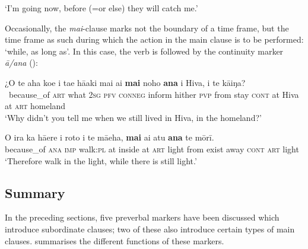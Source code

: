 \glt 
‘I’m going now, before (=or else) they will catch me.’ \textstyleExampleref{[R304.117]} 
\z

Occasionally, the \textit{mai}{}-clause marks not the boundary of a time frame, but the time frame as such during which the action in the main clause is to be performed: ‘while, as long as’. In this case, the verb is followed by the continuity marker \textit{{\ꞌ}ā/{\ꞌ}ana} ():

\ea\label{ex:11.208}
\gll ¿{\ꞌ}O te aha koe i ta{\ꞌ}e hā{\ꞌ}aki mai ai \textbf{mai} noho \textbf{{\ꞌ}ana}  {\ꞌ}i Hiva, {\ꞌ}i te kāiŋa?\\
~because\_of \textsc{art} what \textsc{2sg} \textsc{pfv} \textsc{conneg} inform hither \textsc{pvp} from stay \textsc{cont}  at Hiva at \textsc{art} homeland\\

\glt 
‘Why didn’t you tell me when we still lived in Hiva, in the homeland?’ \textstyleExampleref{[Ley-2-07.028]}
\z

\ea\label{ex:11.209}
\gll {\ꞌ}O ira ka hā{\ꞌ}ere {\ꞌ}i roto i te mā{\ꞌ}eha, \textbf{mai} ai atu \textbf{{\ꞌ}ana} te mōrī. \\
because\_of \textsc{ana} \textsc{imp} walk:\textsc{pl} at inside at \textsc{art} light from exist away \textsc{cont} \textsc{art} light \\

\glt 
‘Therefore walk in the light, while there is still light.’ \textstyleExampleref{[John 12:35]}\textstyleExampleref{} 
\z
{}

\subsection{Summary}\label{sec:11.5.6}

In the preceding sections, five preverbal markers have been discussed which introduce subordinate clauses; two of these also introduce certain types of main clauses.  summarises the different functions of these markers.

